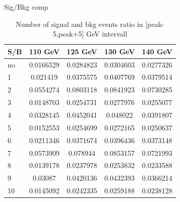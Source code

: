 \documentclass[10pt,UKenglish, leqno, xcolor = dvipsnames]{beamer}
\begin{document}
		\begin{frame}{Sig/Bkg comp}
			\vfill
			\centering
			\begin{table}[tbp]
				\centering
				\begin{tabular}{lcccc}
					\toprule[1.5pt]
					S/B			& 110 GeV	& 125 GeV	& 130 GeV	& 140 GeV	\\
					\midrule
					no	& 0.0166529	& 0.0284823	& 0.0304603	& 0.0277326	\\
					1	& 0.021419	& 0.0375575	& 0.0407769	& 0.0379514 \\
					2	& 0.0554274	& 0.0803118	& 0.0841923	& 0.0730285	\\ 
					3	& 0.0148703	& 0.0254731	& 0.0277976	& 0.0255077	\\ 
					4	& 0.0328145	& 0.0452041	& 0.048022	& 0.0391807 \\
					5	& 0.0152553	& 0.0254699	& 0.0272165	& 0.0250637 \\
					6	& 0.0211346	& 0.0371674	& 0.0396436	& 0.0373148 \\
					7	& 0.0573909	& 0.078944	& 0.0853157	& 0.0721993 \\
					8	& 0.0139178	& 0.0237978	& 0.0253832	& 0.0233588	\\ 
					9	& 0.03087	& 0.0420136	& 0.0432393	& 0.0366214	\\ 
					10	& 0.0145092	& 0.0242335	& 0.0259188	& 0.0238128 \\
					\bottomrule[1.5pt]
				\end{tabular}
				\caption{Number of signal and bkg events ratio in [peak-5,peak+5] GeV intervall}
			\end{table}
			\vfill
		\end{frame}
	
\end{document}
